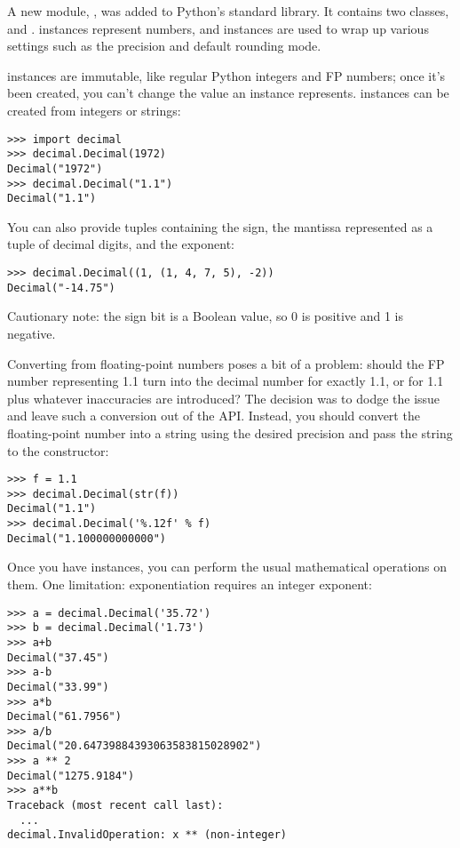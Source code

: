 \documentclass{howto}
\begin{document}
A new module, , was added to Python's standard
library.  It contains two classes,  and
.   instances represent numbers, and
 instances are used to wrap up various settings such as
the precision and default rounding mode.

 instances are immutable, like regular Python integers
and FP numbers; once it's been created, you can't change the value an
instance represents.   instances can be created from
integers or strings:

\begin{verbatim}
>>> import decimal
>>> decimal.Decimal(1972)
Decimal("1972")
>>> decimal.Decimal("1.1")
Decimal("1.1")
\end{verbatim}

You can also provide tuples containing the sign, the mantissa represented 
as a tuple of decimal digits, and the exponent:

\begin{verbatim}
>>> decimal.Decimal((1, (1, 4, 7, 5), -2))
Decimal("-14.75")
\end{verbatim}

Cautionary note: the sign bit is a Boolean value, so 0 is positive and
1 is negative. 

Converting from floating-point numbers poses a bit of a problem:
should the FP number representing 1.1 turn into the decimal number for
exactly 1.1, or for 1.1 plus whatever inaccuracies are introduced?
The decision was to dodge the issue and leave such a conversion out of
the API.  Instead, you should convert the floating-point number into a
string using the desired precision and pass the string to the
 constructor:

\begin{verbatim}
>>> f = 1.1
>>> decimal.Decimal(str(f))
Decimal("1.1")
>>> decimal.Decimal('%.12f' % f)
Decimal("1.100000000000")
\end{verbatim}

Once you have  instances, you can perform the usual
mathematical operations on them.  One limitation: exponentiation
requires an integer exponent:

\begin{verbatim}
>>> a = decimal.Decimal('35.72')
>>> b = decimal.Decimal('1.73')
>>> a+b
Decimal("37.45")
>>> a-b
Decimal("33.99")
>>> a*b
Decimal("61.7956")
>>> a/b
Decimal("20.64739884393063583815028902")
>>> a ** 2
Decimal("1275.9184")
>>> a**b
Traceback (most recent call last):
  ...
decimal.InvalidOperation: x ** (non-integer)
\end{verbatim}
\end{document}
